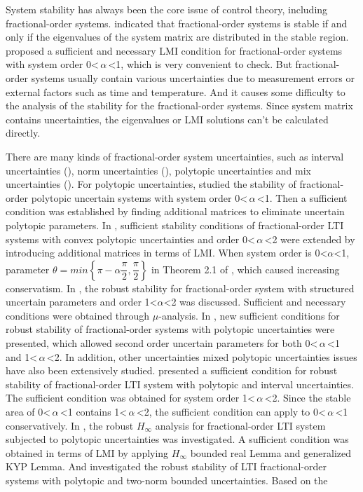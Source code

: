 \documentclass[]{interact}
\theoremstyle{plain}%
\theoremstyle{definition}
\theoremstyle{remark}
\begin{document}
\par System stability has always been the core issue of control theory, including fractional-order systems. \cite{Mat1996} indicated that fractional-order systems is stable if and only if the eigenvalues of the system matrix are distributed in the stable region. \cite{Far2010} proposed a sufficient and necessary LMI condition for fractional-order systems with system order 0\textless\,$\alpha$\,\textless1, which is very convenient to check. But fractional-order systems usually contain various uncertainties due to measurement errors or external factors such as time and temperature. And it causes some difficulty to the analysis of the stability for the fractional-order systems. Since system matrix contains uncertainties, the eigenvalues or LMI solutions can't be calculated directly.
\par There are many kinds of fractional-order system uncertainties, such as interval uncertainties (\citealp{Lu2010,Ala2015,Gao2015}), norm uncertainties (\citealp{Ibr2015,Lu2017}), polytopic uncertainties and mix uncertainties (\citealp{Matusu2017}). For polytopic uncertainties, \cite{Far2011} studied the stability of fractional-order polytopic uncertain systems with system order 0\textless\,$\alpha$\,\textless1. Then a sufficient condition was established by finding additional matrices to eliminate uncertain polytopic parameters. In \cite{Lu2013a}, sufficient stability conditions of fractional-order LTI systems with convex polytopic uncertainties and order 0\textless\,$\alpha$\,\textless2 were extended by introducing additional matrices in terms of LMI. When system order is 0\textless$\alpha$\textless1, parameter $\theta = min\left\lbrace \pi-\alpha\dfrac{\pi}{2}, \dfrac{\pi}{2}\right\rbrace$ in Theorem 2.1 of \cite{Lu2013a}, which caused increasing conservatism. In \cite{Lu2013b}, the robust stability for fractional-order system with structured uncertain parameters and order 1\textless$\alpha$\textless2 was discussed. Sufficient and necessary conditions were obtained through $\mu$-analysis. In \cite{Chen2015}, new sufficient conditions for robust stability of fractional-order systems with polytopic uncertainties were presented, which allowed second order uncertain parameters for both 0\textless\,$\alpha$\,\textless1 and 1\textless\,$\alpha$\,\textless2. In addition, other uncertainties mixed polytopic uncertainties issues have also been extensively studied. \cite{Abo2017} presented a sufficient condition for robust stability of fractional-order LTI system with polytopic and interval uncertainties. The sufficient condition was obtained for system order 1\textless\,$\alpha$\,\textless2. Since the stable area of 0\textless\,$\alpha$\,\textless1 contains 1\textless\,$\alpha$\,\textless2, the sufficient condition can apply to 0\textless\,$\alpha$\,\textless1 conservatively. In \cite{Xie2017}, the robust $H_\infty$ analysis for fractional-order LTI system subjected to polytopic uncertainties was investigated. A sufficient condition was obtained in terms of LMI by applying $H_\infty$ bounded real Lemma and generalized KYP Lemma.  And \cite{Li2018} investigated the robust stability of LTI fractional-order systems with polytopic and two-norm bounded uncertainties. Based on the 
\end{document}
